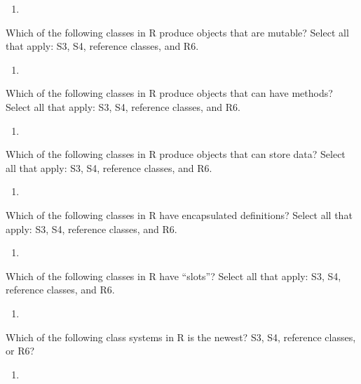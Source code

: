 \documentclass[
  12pt,
  krantz2]{krantz}
\providecommand{\tightlist}{%
  \setlength{\itemsep}{0pt}\setlength{\parskip}{0pt}}
\begin{document}
\begin{enumerate}
\def\labelenumi{\arabic{enumi}.}
\tightlist
\item
\end{enumerate}

Which of the following classes in R produce objects that are mutable? Select all that apply: S3, S4, reference classes, and R6.

\begin{enumerate}
\def\labelenumi{\arabic{enumi}.}
\setcounter{enumi}{1}
\tightlist
\item
\end{enumerate}

Which of the following classes in R produce objects that can have methods? Select all that apply: S3, S4, reference classes, and R6.

\begin{enumerate}
\def\labelenumi{\arabic{enumi}.}
\setcounter{enumi}{2}
\tightlist
\item
\end{enumerate}

Which of the following classes in R produce objects that can store data? Select all that apply: S3, S4, reference classes, and R6.

\begin{enumerate}
\def\labelenumi{\arabic{enumi}.}
\setcounter{enumi}{3}
\tightlist
\item
\end{enumerate}

Which of the following classes in R have encapsulated definitions? Select all that apply: S3, S4, reference classes, and R6.

\begin{enumerate}
\def\labelenumi{\arabic{enumi}.}
\setcounter{enumi}{4}
\tightlist
\item
\end{enumerate}

Which of the following classes in R have ``slots''? Select all that apply: S3, S4, reference classes, and R6.

\begin{enumerate}
\def\labelenumi{\arabic{enumi}.}
\setcounter{enumi}{5}
\tightlist
\item
\end{enumerate}

Which of the following class systems in R is the newest? S3, S4, reference classes, or R6?

\begin{enumerate}
\def\labelenumi{\arabic{enumi}.}
\setcounter{enumi}{6}
\tightlist
\item
\end{enumerate}
\end{document}
